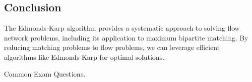 \subsection{Conclusion}
\begin{summary}
    The Edmonds-Karp algorithm provides a systematic approach to solving flow network problems, including its application to maximum bipartite matching. By reducing matching problems to flow problems, we can leverage efficient algorithms like Edmonds-Karp for optimal solutions.
\end{summary}

\begin{warning}
    Common Exam Questions.
\end{warning}
